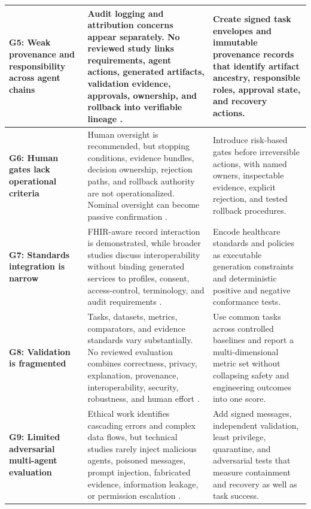 \documentclass[11pt,a4paper]{article}
\begin{document}
\begin{longtable}{|L{3.75cm}|L{5.95cm}|L{4.55cm}|}
\hline
\textbf{G5: Weak provenance and responsibility across agent chains} & Audit logging and attribution concerns appear separately. No reviewed study links requirements, agent actions, generated artifacts, validation evidence, approvals, ownership, and rollback into verifiable lineage \cite{shehab2025agentic,xie2026ethical}. & Create signed task envelopes and immutable provenance records that identify artifact ancestry, responsible roles, approval state, and recovery actions. \\
\hline
\textbf{G6: Human gates lack operational criteria} & Human oversight is recommended, but stopping conditions, evidence bundles, decision ownership, rejection paths, and rollback authority are not operationalized. Nominal oversight can become passive confirmation \cite[pp.~10--11]{xie2026ethical}. & Introduce risk-based gates before irreversible actions, with named owners, inspectable evidence, explicit rejection, and tested rollback procedures. \\
\hline
\textbf{G7: Standards integration is narrow} & FHIR-aware record interaction is demonstrated, while broader studies discuss interoperability without binding generated services to profiles, consent, access-control, terminology, and audit requirements \cite{demaio2025privacy,saeed2025applications,okeke2025overview}. & Encode healthcare standards and policies as executable generation constraints and deterministic positive and negative conformance tests. \\
\hline
\textbf{G8: Validation is fragmented} & Tasks, datasets, metrics, comparators, and evidence standards vary substantially. No reviewed evaluation combines correctness, privacy, explanation, provenance, interoperability, security, robustness, and human effort \cite{becker2018survey,gorenshtein2025clinical,ode2025evidence,boye2025decision}. & Use common tasks across controlled baselines and report a multi-dimensional metric set without collapsing safety and engineering outcomes into one score. \\
\hline
\textbf{G9: Limited adversarial multi-agent evaluation} & Ethical work identifies cascading errors and complex data flows, but technical studies rarely inject malicious agents, poisoned messages, prompt injection, fabricated evidence, information leakage, or permission escalation \cite{xie2026ethical}. & Add signed messages, independent validation, least privilege, quarantine, and adversarial tests that measure containment and recovery as well as task success. \\
\end{longtable}
\endgroup
\end{document}
